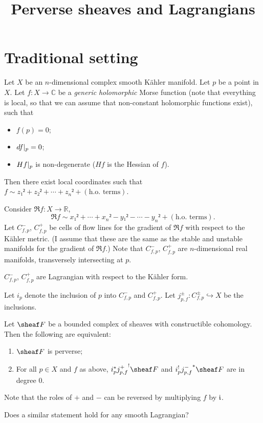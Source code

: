 \documentclass[english]{short-notes}
\title{Perverse sheaves and Lagrangians}
\newcommand\me{\normalcolor}
\newcommand\david{\color{black!60!green}}
\let\David\david
\begin{document}
\maketitle

\section{Traditional setting}

\david
Let $X$ be an $n$-dimensional complex smooth Kähler manifold.
Let $p$ be a point in $X$.
Let $f\colon X → ℂ$ be a \emph{generic} \emph{holomorphic} Morse function (note that everything is local, so that we can assume that non-constant holomorphic functions exist), such that
\begin{itemize}
    \item $f(p) = 0$;
    \item $\res{df}p = 0$;
    \item $\res{Hf}p $ is non-degenerate \me($Hf$ is the Hessian of $f$)\david.
\end{itemize}
Then there exist local coordinates such that $f \sim z₁² + z₂² + \dotsb + z_n² + (\text{h.o.\ terms})$.

Consider $\Re f\colon X → ℝ$,
\[
\Re f \sim x₁² + \dotsb + x_n² - y₁² - \dotsb -y_n² + (\text{h.o.\ terms}).
\]
Let $C_{f,p}^-$, $C_{f,p}^+$ be cells of flow lines for the gradient of $\Re f$ with respect to the Kähler metric.
\me(I assume that these are the same as the stable and unstable manifolds for the gradient of $\Re f$.)
\David
Note that $C_{f,p}^-$, $C_{f,p}^+$ are $n$-dimensional real manifolds, transversely intersecting at $p$.

\begin{Prop}
    $C_{f,p}^-$, $C_{f,p}^+$ are Lagrangian with respect to the Kähler form.
\end{Prop}

Let $i_p$ denote the inclusion of $p$ into $C_{f,p}^-$ and $C_{f,p}^+$.
Let $j_{p,f}^\pm\colon C_{f,p}^\pm \hookrightarrow X$ be the inclusions.

\begin{Thm}
    Let $\sheaf F$ be a bounded complex of sheaves with constructible cohomology.
    Then the following are equivalent:
    \begin{enumerate}
        \item $\sheaf F$ is perverse;
        \item For all $p ∈ X$ and $f$ as above, $i_p^* {j_{p,f}^+}^! \sheaf F$ and $i_p^!{j_{p,f}^-}^* \sheaf F$ are in degree $0$.
    \end{enumerate}
\end{Thm}

Note that the roles of $+$ and $-$ can be reversed by multiplying $f$ by $\mathfrak i$.

\begin{Q}
    Does a similar statement hold for any smooth Lagrangian?
\end{Q}
\end{document}

